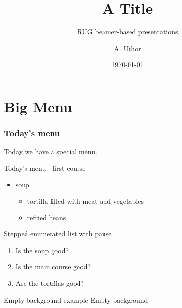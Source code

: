 \documentclass[%
  10pt,%
]{../templates/pres_template/cognigronbeamer}
\date{\today}
\title{A Title}
\subtitle{RUG beamer-based presentations}
\author{A. Uthor}
\institute{University of Groningen\\ Faculty of Science and Engineering}
\begin{document}
{
\begin{frame}%
\titlepage
\end{frame}
}

\section{Big Menu}

\begin{frame}
  \frametitle{Today's menu}
  Today we have a special menu.
\end{frame}

\begin{frame}{Today's menu - first course}
  \begin{itemize}
    \item soup
      \begin{itemize}
      \item tortilla filled with meat and vegetables
      \item refried beans
      \end{itemize}
  \end{itemize}
\end{frame}

\begin{frame}{Stepped enumerated list with {\ttfamily pause}}
  \begin{enumerate}
    \item Is the soup good?\pause
    \item Is the main course good?\pause
    \item Are the tortillas good?
  \end{enumerate}
\end{frame}



{
\begin{frame}[plain]{Empty background example}
  Empty background
\end{frame}
}
\end{document}
